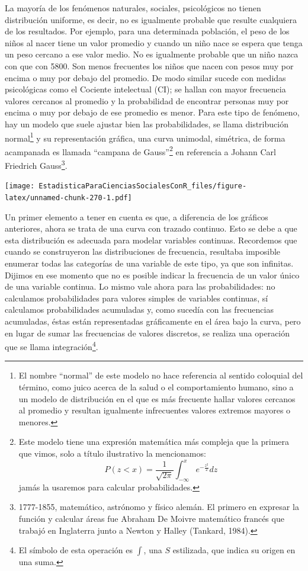 \documentclass[]{book}
\let\rmarkdownfootnote\footnote%
\def\footnote{\protect\rmarkdownfootnote}
\begin{document}
La mayoría de los fenómenos naturales, sociales, psicológicos no tienen
distribución uniforme, es decir, no es igualmente probable que resulte
cualquiera de los resultados. Por ejemplo, para una determinada
población, el peso de los niños al nacer tiene un valor promedio y
cuando un niño nace se espera que tenga un peso cercano a ese valor
medio. No es igualmente probable que un niño nazca con que con 5800. Son
menos frecuentes los niños que nacen con pesos muy por encima o muy por
debajo del promedio. De modo similar sucede con medidas psicológicas
como el Cociente intelectual (CI); se hallan con mayor frecuencia
valores cercanos al promedio y la probabilidad de encontrar personas muy
por encima o muy por debajo de ese promedio es menor. Para este tipo de
fenómeno, hay un modelo que suele ajustar bien las probabilidades, se
llama distribución normal\footnote{El nombre ``normal'' de este modelo no hace referencia al sentido
  coloquial del término, como juico acerca de la salud o el
  comportamiento humano, sino a un modelo de distribución en el que es
  más frecuente hallar valores cercanos al promedio y resultan
  igualmente infrecuentes valores extremos mayores o menores.} y su representación gráfica, una curva
unimodal, simétrica, de forma acampanada es llamada ``campana de
Gauss''\footnote{Este modelo tiene una expresión matemática más compleja que la primera que vimos, solo a título ilustrativo la mencionamos: \[P(z < x) = \frac{1}{\sqrt{2\pi}}\int_{- \infty}^{x}e^{- \frac{z^{2}}{2}} dz\] jamás la usaremos para calcular probabilidades.} en referencia a Johann Carl Friedrich Gauss\footnote{1777-1855, matemático, astrónomo y físico alemán. El primero en
  expresar la función y calcular áreas fue Abraham De Moivre
  matemático francés que trabajó en Inglaterra junto a Newton y Halley
  (Tankard, 1984).}.

\texttt{[image: EstadisticaParaCienciasSocialesConR\_files/figure-latex/unnamed-chunk-270-1.pdf]}

Un primer elemento a tener en cuenta es que, a diferencia de los
gráficos anteriores, ahora se trata de una curva con trazado continuo.
Esto se debe a que esta distribución es adecuada para modelar variables
continuas. Recordemos que cuando se construyeron las distribuciones de
frecuencia, resultaba imposible enumerar todas las categorías de una
variable de este tipo, ya que son infinitas. Dijimos en ese momento que
no es posible indicar la frecuencia de un valor único de una variable
continua. Lo mismo vale ahora para las probabilidades: no calculamos
probabilidades para valores simples de variables continuas, sí
calculamos probabilidades acumuladas y, como sucedía con las frecuencias
acumuladas, éstas están representadas gráficamente en el área bajo la
curva, pero en lugar de sumar las frecuencias de valores discretos, se
realiza una operación que se llama integración\footnote{El símbolo de esta operación es \(\int\), una \(S\) estilizada, que indica
  su origen en una suma.}.
\end{document}
